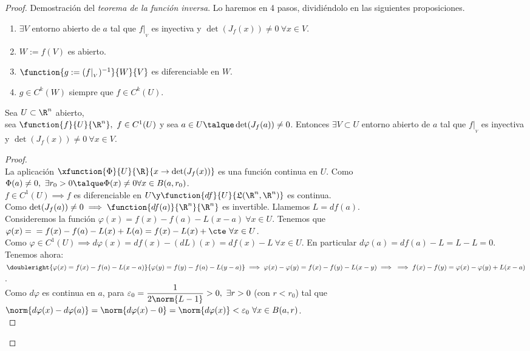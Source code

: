 	\begin{proof} Demostración del \textit{teorema de la función inversa}.
	Lo haremos en 4 pasos, dividiéndolo en las siguientes proposiciones.
	\begin{enumerate}[1)]
	\item $\exists V$ entorno abierto de $a$ tal que $f|_{_V}$ es inyectiva y $\det(J_f(x))\neq 0\ \forall x\in V$.
	\item $W:=f(V)$ es abierto.
	\item $\function{g:=(f|_{_V})^{-1}}{W}{V}$ es diferenciable en $W$.
	\item $g\in C^k(W)$ siempre que $f\in C^k(U)$.
	\end{enumerate}
	\begin{proposicioni} Sea $U\subset\R^n$ abierto,\\
	sea $\function{f}{U}{\R^n},\ f\in C^1(U)$ y sea $a\in U\talque \det (J_f(a))\neq 0$. Entonces $\exists V\subset U$ entorno abierto de $a$ tal que $f|_{_V}$ es inyectiva y $\det(J_f(x))\neq 0\ \forall x\in V$.
	\begin{proof}\ \\
	La aplicación $\xfunction{\Phi}{U}{\R}{x\to\det(J_f(x))}$ es una función continua en $U$. Como $\Phi(a)\neq 0,\ \exists r_0>0\talque \Phi(x)\neq 0\\
	\forall x\in B(a,r_0)$.\\
	$f\in C^1(U)\implies f$ es diferenciable en $U\y \function{df}{U}{\mathfrak{L}(\R^n,\R^n)}$ es continua.\\
	Como $\det(J_f(a))\neq 0\implies \function{df(a)}{\R^n}{\R^n}$ es invertible. Llamemos $L=df(a)$.\\
	Consideremos la función $\varphi(x)=f(x)-f(a)-L(x-a)\ \forall x\in U$. Tenemos que $\varphi(x)=\\
	=f(x)-f(a)-L(x)+L(a)=f(x)-L(x)+\cte\ \forall x\in U$.\\
	Como $\varphi\in C^1(U)\implies d\varphi(x)=df(x)-(dL)(x)=df(x)-L\ \forall x\in U$. En particular $d\varphi(a)=df(a)-L=L-L=0$. Tenemos ahora:\\
	$\doubleright{\varphi(x)=f(x)-f(a)-L(x-a)}{\varphi(y)=f(y)-f(a)-L(y-a)}\implies\varphi(x)-\varphi(y)=f(x)-f(y)-L(x-y)\implies\\
	\implies f(x)-f(y)=\varphi(x)-\varphi(y)+L(x-a)$.\\
	Como $d\varphi$ es continua en $a$, para $\varepsilon_0=\dfrac{1}{2\norm{L-1}}>0,\ \exists r>0$ (con $r<r_0$) tal que\\
	$\norm{d\varphi(x)-d\varphi(a)}=\norm{d\varphi(x)-0}=\norm{d\varphi(x)}<\varepsilon_0\ \forall x\in B(a,r)$.\\

\end{proof}
\end{proposicioni}
\end{proof}
